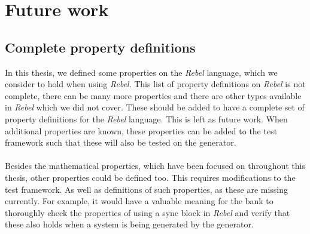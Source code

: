 \section{Future work}
\subsection*{Complete property definitions}
In this thesis, we defined some properties on the \textit{Rebel} language,
which we consider to hold when using \textit{Rebel}. This list of property
definitions on \textit{Rebel} is not complete, there can be many more properties
and there are other types available in \textit{Rebel} which we did not cover.
These should be added to have a complete set of property definitions for the
\textit{Rebel} language. This is left as future work. When additional properties
are known, these properties can be added to the test framework such that these
will also be tested on the generator.\\
\\
Besides the mathematical properties, which have been focused on throughout this
thesis, other properties could be defined too. This requires modifications to
the test framework. As well as definitions of such properties, as these are
missing currently. For example, it would have a valuable meaning for the bank to
thoroughly check the properties of using a sync block in \textit{Rebel} and
verify that these also holds when a system is being generated by the generator.

